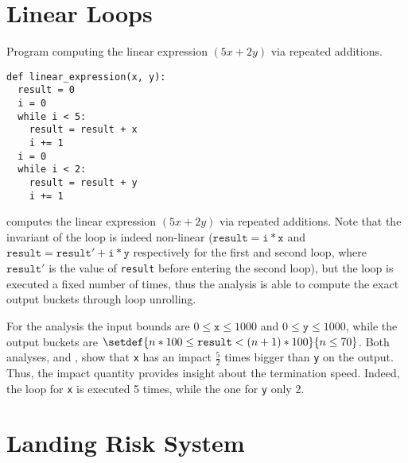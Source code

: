 \section{Linear Loops}


\begin{marginlisting}
  \caption{Program computing the linear expression $(5x + 2y)$ via repeated additions.}
  \vspace{0.9cm}
\begin{lstlisting}[style=mystyle,
  language=customPython,
  escapechar=\%,
]
def linear_expression(x, y):
  result = 0
  i = 0
  while i < 5:
    result = result + x
    i += 1
  i = 0
  while i < 2:
    result = result + y
    i += 1
\end{lstlisting}
\end{marginlisting}

 computes the linear expression $(5x + 2y)$ via repeated additions.
Note that the invariant of the loop is indeed non-linear ($\texttt{result} = \texttt{i} * \texttt{x}$ and $\texttt{result} = \texttt{result}' + \texttt{i} * \texttt{y}$ respectively for the first and second loop, where $\texttt{result}'$ is the value of \texttt{result} before entering the second loop), but the loop is executed a fixed number of times, thus the analysis is able to compute the exact output buckets through loop unrolling.

For the analysis the input bounds are $0 \le \texttt{x} \le 1000$ and $0 \le \texttt{y} \le 1000$, while the output buckets are $\setdef{n * 100 \le \texttt{result} < (n + 1) * 100}{n \le 70}$.
Both analyses, \abstractoutcomesname{} and \abstractrangename, show that \texttt{x} has an impact $\frac{5}{2}$ times bigger than \texttt{y} on the output.
Thus, the impact quantity provides insight about the termination speed.
Indeed, the loop for \texttt{x} is executed 5 times, while the one for \texttt{y} only 2.


\section{Landing Risk System}





